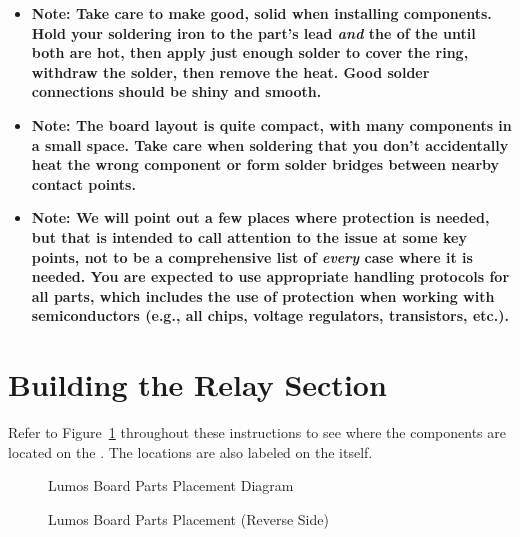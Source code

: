 \documentclass[letterpaper,twoside,onecolumn,openright,final]{memoir}
\begin{document}
\begin{itemize}
\item[\HandRight] \bfseries{Note:} 
Take care to make good, solid  when installing components.
Hold your soldering iron to the part's lead \emph{and} the  of the 
until both are hot, then apply just enough solder to cover the ring, withdraw the solder, then 
remove the heat.  Good solder connections should be shiny and smooth.

\item[\HandRight] \bfseries{Note:} 
The board layout is quite compact, with many components in a small space.  Take
care when soldering that you don't accidentally heat the wrong component or form solder bridges between
nearby contact points.

\item[\HandRight] \bfseries{Note:} 
We will point out a few places where  protection is needed, but
that is intended to call attention to the issue at some key points, not to be a comprehensive list of
\emph{every} case where it is needed.  You are expected to use appropriate handling protocols for all
parts, which includes the use of  protection when working with semiconductors (e.g., all
chips, voltage regulators, transistors, etc.).
\end{itemize}


\section{Building the Relay Section}
Refer to Figure~\ref{fig:placement} throughout these instructions to see where the components are 
located on the .  The locations are also labeled on the  itself.

\begin{figure}
\centerline{}
\caption{Lumos Board Parts Placement Diagram\label{fig:placement}}
\end{figure}
\begin{figure}
\centerline{}
\caption{Lumos Board Parts Placement (Reverse Side)\label{fig:placement-back}}
\end{figure}
\end{document}
